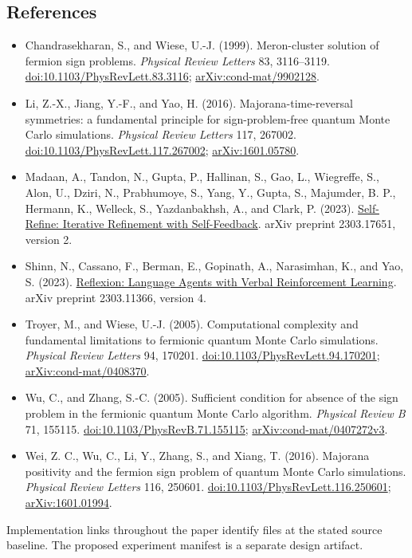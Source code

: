 \documentclass[
  11pt,
]{article}
\providecommand{\tightlist}{%
  \setlength{\itemsep}{0pt}\setlength{\parskip}{0pt}}
\begin{document}
\hypertarget{references}{%
\subsection{References}\label{references}}

\begin{itemize}
\tightlist
\item
  Chandrasekharan, S., and Wiese, U.-J. (1999). Meron-cluster solution
  of fermion sign problems. \emph{Physical Review Letters} 83,
  3116--3119.
  \href{https://doi.org/10.1103/PhysRevLett.83.3116}{doi:10.1103/PhysRevLett.83.3116};
  \href{https://arxiv.org/abs/cond-mat/9902128}{arXiv:cond-mat/9902128}.
\item
  Li, Z.-X., Jiang, Y.-F., and Yao, H. (2016). Majorana-time-reversal
  symmetries: a fundamental principle for sign-problem-free quantum
  Monte Carlo simulations. \emph{Physical Review Letters} 117, 267002.
  \href{https://doi.org/10.1103/PhysRevLett.117.267002}{doi:10.1103/PhysRevLett.117.267002};
  \href{https://arxiv.org/abs/1601.05780}{arXiv:1601.05780}.
\item
  Madaan, A., Tandon, N., Gupta, P., Hallinan, S., Gao, L., Wiegreffe,
  S., Alon, U., Dziri, N., Prabhumoye, S., Yang, Y., Gupta, S.,
  Majumder, B. P., Hermann, K., Welleck, S., Yazdanbakhsh, A., and
  Clark, P. (2023).
  \href{https://arxiv.org/abs/2303.17651v2}{Self-Refine: Iterative
  Refinement with Self-Feedback}. arXiv preprint 2303.17651, version 2.
\item
  Shinn, N., Cassano, F., Berman, E., Gopinath, A., Narasimhan, K., and
  Yao, S. (2023). \href{https://arxiv.org/abs/2303.11366v4}{Reflexion:
  Language Agents with Verbal Reinforcement Learning}. arXiv preprint
  2303.11366, version 4.
\item
  Troyer, M., and Wiese, U.-J. (2005). Computational complexity and
  fundamental limitations to fermionic quantum Monte Carlo simulations.
  \emph{Physical Review Letters} 94, 170201.
  \href{https://doi.org/10.1103/PhysRevLett.94.170201}{doi:10.1103/PhysRevLett.94.170201};
  \href{https://arxiv.org/abs/cond-mat/0408370}{arXiv:cond-mat/0408370}.
\item
  Wu, C., and Zhang, S.-C. (2005). Sufficient condition for absence of
  the sign problem in the fermionic quantum Monte Carlo algorithm.
  \emph{Physical Review B} 71, 155115.
  \href{https://doi.org/10.1103/PhysRevB.71.155115}{doi:10.1103/PhysRevB.71.155115};
  \href{https://arxiv.org/abs/cond-mat/0407272v3}{arXiv:cond-mat/0407272v3}.
\item
  Wei, Z. C., Wu, C., Li, Y., Zhang, S., and Xiang, T. (2016). Majorana
  positivity and the fermion sign problem of quantum Monte Carlo
  simulations. \emph{Physical Review Letters} 116, 250601.
  \href{https://doi.org/10.1103/PhysRevLett.116.250601}{doi:10.1103/PhysRevLett.116.250601};
  \href{https://arxiv.org/abs/1601.01994}{arXiv:1601.01994}.
\end{itemize}

Implementation links throughout the paper identify files at the stated
source baseline. The proposed experiment manifest is a separate design
artifact.
\end{document}
